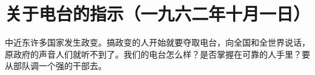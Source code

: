 \section{关于电台的指示（一九六二年十月一日）}


中近东许多国家发生政变。搞政变的人开始就要夺取电台，向全国和全世界说话，原政府的声音人们就听不到了。我们的电台怎么样？是否掌握在可靠的人手里？要从部队调一个强的干部去。


